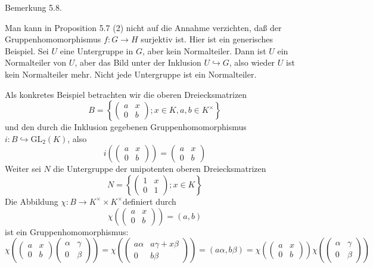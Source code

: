\documentclass[10pt, letterpaper]{article}
\begin{document}
Bemerkung 5.8. 

Man kann in Proposition 5.7 (2) nicht auf die Annahme verzichten, daß der Gruppenhomomorphismus $f: G \rightarrow H$ surjektiv ist. Hier ist ein generisches Beispiel. Sei $U$ eine Untergruppe in $G$, aber kein Normalteiler. Dann ist $U$ ein Normalteiler von $U$, aber das Bild unter der Inklusion $U \hookrightarrow G$, also wieder $U$ ist kein Normalteiler mehr. Nicht jede Untergruppe ist ein Normalteiler.

Als konkretes Beispiel betrachten wir die oberen Dreiecksmatrizen
$$
B=\left\{\left(\begin{array}{cc}
a & x \\
0 & b
\end{array}\right) ; x \in K, a, b \in K^{\times}\right\}
$$
und den durch die Inklusion gegebenen Gruppenhomomorphismus $i: B \hookrightarrow \mathrm{GL}_{2}(K)$, also
$$
i\left(\left(\begin{array}{ll}
a & x \\
0 & b
\end{array}\right)\right)=\left(\begin{array}{ll}
a & x \\
0 & b
\end{array}\right)
$$
Weiter sei $N$ die Untergruppe der unipotenten oberen Dreiecksmatrizen
$$
N=\left\{\left(\begin{array}{cc}
1 & x \\
0 & 1
\end{array}\right) ; x \in K\right\}
$$
Die Abbildung $\chi: B \rightarrow K^{\times} \times K^{\times}$definiert durch
$$
\chi\left(\left(\begin{array}{ll}
a & x \\
0 & b
\end{array}\right)\right)=(a, b)
$$
ist ein Gruppenhomomorphismus:
$$
\chi\left(\left(\begin{array}{ll}
a & x \\
0 & b
\end{array}\right)\left(\begin{array}{cc}
\alpha & \gamma \\
0 & \beta
\end{array}\right)\right)=\chi\left(\left(\begin{array}{cc}
a \alpha & a \gamma+x \beta \\
0 & b \beta
\end{array}\right)\right)=(a \alpha, b \beta)=\chi\left(\left(\begin{array}{cc}
a & x \\
0 & b
\end{array}\right)\right) \chi\left(\left(\begin{array}{cc}
\alpha & \gamma \\
0 & \beta
\end{array}\right)\right)
$$
\end{document}
